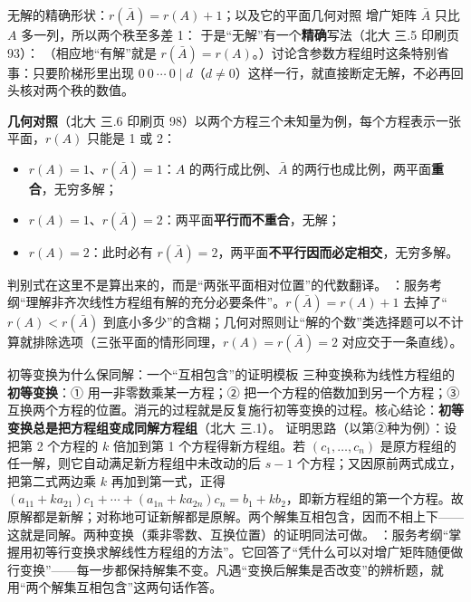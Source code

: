 \begin{fdeep}{无解的精确形状：$r(\bar A)=r(A)+1$；以及它的平面几何对照}
增广矩阵 $\bar A$ 只比 $A$ 多一列，所以两个秩至多差 1：
于是“无解”有一个\textbf{精确}写法（北大 三.5 印刷页 93）：
（相应地“有解”就是 $r(\bar A)=r(A)$。）讨论含参数方程组时这条特别省事：只要阶梯形里出现 $0\ 0\ \cdots\ 0\mid d$（$d\ne0$）这样一行，就直接断定无解，不必再回头核对两个秩的数值。

\textbf{几何对照}（北大 三.6 印刷页 98）以两个方程三个未知量为例，每个方程表示一张平面，$r(A)$ 只能是 1 或 2：
\begin{itemize}[leftmargin=2.2em,itemsep=0.25em]
\item $r(A)=1$、$r(\bar A)=1$：$A$ 的两行成比例、$\bar A$ 的两行也成比例，两平面\textbf{重合}，无穷多解；
\item $r(A)=1$、$r(\bar A)=2$：两平面\textbf{平行而不重合}，无解；
\item $r(A)=2$：此时必有 $r(\bar A)=2$，两平面\textbf{不平行因而必定相交}，无穷多解。
\end{itemize}
判别式在这里不是算出来的，而是“两张平面相对位置”的代数翻译。
\fbref{}：服务考纲“理解非齐次线性方程组有解的充分必要条件”。$r(\bar A)=r(A)+1$ 去掉了“$r(A)<r(\bar A)$ 到底小多少”的含糊；几何对照则让“解的个数”类选择题可以不计算就排除选项（三张平面的情形同理，$r(A)=r(\bar A)=2$ 对应交于一条直线）。
\end{fdeep}

\begin{fdeep}{初等变换为什么保同解：一个“互相包含”的证明模板}
三种变换称为线性方程组的\textbf{初等变换}：① 用一非零数乘某一方程；② 把一个方程的倍数加到另一个方程；③ 互换两个方程的位置。消元的过程就是反复施行初等变换的过程。核心结论：\textbf{初等变换总是把方程组变成同解方程组}（北大 三.1）。
证明思路（以第②种为例）：设把第 2 个方程的 $k$ 倍加到第 1 个方程得新方程组。若 $(c_1,\dots,c_n)$ 是原方程组的任一解，则它自动满足新方程组中未改动的后 $s-1$ 个方程；又因原前两式成立，
把第二式两边乘 $k$ 再加到第一式，正得 $(a_{11}+ka_{21})c_1+\cdots+(a_{1n}+ka_{2n})c_n=b_1+kb_2$，即新方程组的第一个方程。故原解都是新解；对称地可证新解都是原解。两个解集互相包含，因而不相上下——这就是同解。两种变换（乘非零数、互换位置）的证明同法可做。
\fbref{}：服务考纲“掌握用初等行变换求解线性方程组的方法”。它回答了“凭什么可以对增广矩阵随便做行变换”——每一步都保持解集不变。凡遇“变换后解集是否改变”的辨析题，就用“两个解集互相包含”这两句话作答。
\end{fdeep}

